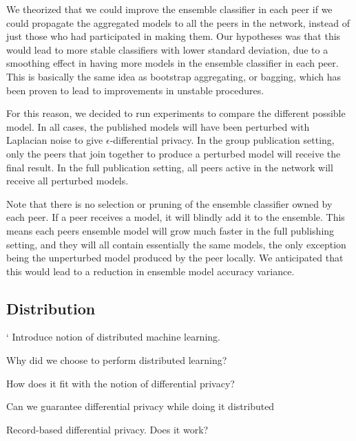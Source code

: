 We theorized that we could improve the ensemble classifier in each peer if we could propagate the aggregated models to all the peers in the network, instead of just those who had participated in making them. Our hypotheses was that this would lead to more stable classifiers with lower standard deviation, due to a smoothing effect in having more models in the ensemble classifier in each peer. This is basically the same idea as bootstrap aggregating, or bagging, which has been proven to lead to improvements in unstable procedures\citep{breiman1996bagging}. 

For this reason, we decided to run experiments to compare the different possible model. In all cases, the published models will have been perturbed with Laplacian noise to give $\epsilon$-differential privacy. In the group publication setting, only the peers that join together to produce a perturbed model will receive the final result. In the full publication setting, all peers active in the network will receive all perturbed models. 

Note that there is no selection or pruning of the ensemble classifier owned by each peer. If a peer receives a model, it will blindly add it to the ensemble. This means each peers ensemble model will grow much faster in the full publishing setting, and they will all contain essentially the same models, the only exception being the unperturbed model produced by the peer locally. We anticipated that this would lead to a reduction in ensemble model accuracy variance.


\subsection{Distribution}`
Introduce notion of distributed machine learning. 

Why did we choose to perform distributed learning?

How does it fit with the notion of differential privacy?

Can we guarantee differential privacy while doing it distributed

Record-based differential privacy. Does it work?







